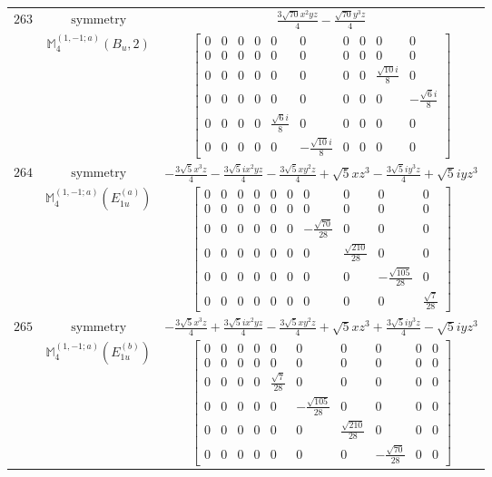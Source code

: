 \documentclass[fleqn,8pt,landscape]{jsarticle}
\begin{document}
\begin{longtable}{ccc}
$ 263 $ & $ \text{symmetry} $ & $ \frac{3 \sqrt{70} x^{2} y z}{4} - \frac{\sqrt{70} y^{3} z}{4} $ \\
$  $ & $ \mathbb{M}_{4}^{(1,-1;a)}(B_{u},2) $ & $ \begin{bmatrix} 0 & 0 & 0 & 0 & 0 & 0 & 0 & 0 & 0 & 0 \\ 0 & 0 & 0 & 0 & 0 & 0 & 0 & 0 & 0 & 0 \\ 0 & 0 & 0 & 0 & 0 & 0 & 0 & 0 & \frac{\sqrt{10} i}{8} & 0 \\ 0 & 0 & 0 & 0 & 0 & 0 & 0 & 0 & 0 & - \frac{\sqrt{6} i}{8} \\ 0 & 0 & 0 & 0 & \frac{\sqrt{6} i}{8} & 0 & 0 & 0 & 0 & 0 \\ 0 & 0 & 0 & 0 & 0 & - \frac{\sqrt{10} i}{8} & 0 & 0 & 0 & 0 \end{bmatrix} $ \\ \hline
$ 264 $ & $ \text{symmetry} $ & $ - \frac{3 \sqrt{5} x^{3} z}{4} - \frac{3 \sqrt{5} i x^{2} y z}{4} - \frac{3 \sqrt{5} x y^{2} z}{4} + \sqrt{5} x z^{3} - \frac{3 \sqrt{5} i y^{3} z}{4} + \sqrt{5} i y z^{3} $ \\
$  $ & $ \mathbb{M}_{4}^{(1,-1;a)}(E_{1u}^{(a)}) $ & $ \begin{bmatrix} 0 & 0 & 0 & 0 & 0 & 0 & 0 & 0 & 0 & 0 \\ 0 & 0 & 0 & 0 & 0 & 0 & 0 & 0 & 0 & 0 \\ 0 & 0 & 0 & 0 & 0 & 0 & - \frac{\sqrt{70}}{28} & 0 & 0 & 0 \\ 0 & 0 & 0 & 0 & 0 & 0 & 0 & \frac{\sqrt{210}}{28} & 0 & 0 \\ 0 & 0 & 0 & 0 & 0 & 0 & 0 & 0 & - \frac{\sqrt{105}}{28} & 0 \\ 0 & 0 & 0 & 0 & 0 & 0 & 0 & 0 & 0 & \frac{\sqrt{7}}{28} \end{bmatrix} $ \\ \hline
$ 265 $ & $ \text{symmetry} $ & $ - \frac{3 \sqrt{5} x^{3} z}{4} + \frac{3 \sqrt{5} i x^{2} y z}{4} - \frac{3 \sqrt{5} x y^{2} z}{4} + \sqrt{5} x z^{3} + \frac{3 \sqrt{5} i y^{3} z}{4} - \sqrt{5} i y z^{3} $ \\
$  $ & $ \mathbb{M}_{4}^{(1,-1;a)}(E_{1u}^{(b)}) $ & $ \begin{bmatrix} 0 & 0 & 0 & 0 & 0 & 0 & 0 & 0 & 0 & 0 \\ 0 & 0 & 0 & 0 & 0 & 0 & 0 & 0 & 0 & 0 \\ 0 & 0 & 0 & 0 & \frac{\sqrt{7}}{28} & 0 & 0 & 0 & 0 & 0 \\ 0 & 0 & 0 & 0 & 0 & - \frac{\sqrt{105}}{28} & 0 & 0 & 0 & 0 \\ 0 & 0 & 0 & 0 & 0 & 0 & \frac{\sqrt{210}}{28} & 0 & 0 & 0 \\ 0 & 0 & 0 & 0 & 0 & 0 & 0 & - \frac{\sqrt{70}}{28} & 0 & 0 \end{bmatrix} $ \\ \hline

\end{longtable}
\end{document}
